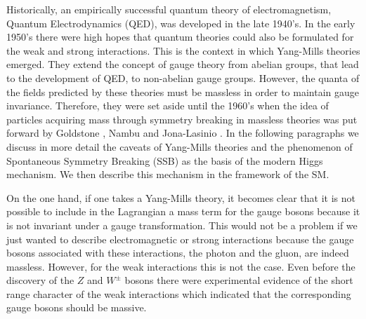 
Historically, an empirically successful quantum theory of electromagnetism, Quantum Electrodynamics (QED), was developed in the late 1940's. In the early 1950's there were high hopes that quantum theories could also be formulated for the weak and strong interactions. This is the context in which Yang-Mills theories emerged. They extend the concept of gauge theory from abelian groups, that lead to the development of QED, to non-abelian gauge groups. However, the quanta of the fields predicted by these theories must be massless in order to maintain gauge invariance. Therefore, they were set aside until the 1960's when the idea of particles acquiring mass through symmetry breaking in massless theories was put forward by Goldstone \cite{Goldstone}, Nambu and Jona-Lasinio \cite{Nambu-Jona-Lasinio}. In the following paragraphs we discuss in more detail the caveats of Yang-Mills theories and the phenomenon of Spontaneous Symmetry Breaking (SSB) as the basis of the modern Higgs mechanism. We then describe this mechanism in the framework of the SM.   

On the one hand, if one takes a Yang-Mills theory, it becomes clear that it is not possible to include in the Lagrangian a mass term for the gauge bosons because it is not invariant under a gauge transformation. This would not be a problem if we just wanted to describe electromagnetic or strong interactions because the gauge bosons associated with these interactions, the photon and the gluon, are indeed massless. However, for the weak interactions this is not the case. Even before the discovery of the $Z$ and $W^{\pm}$ bosons \cite{Zdiscovery,Wdiscovery} there were experimental evidence of the short range character of the weak interactions which indicated that the corresponding gauge bosons should be massive. 

